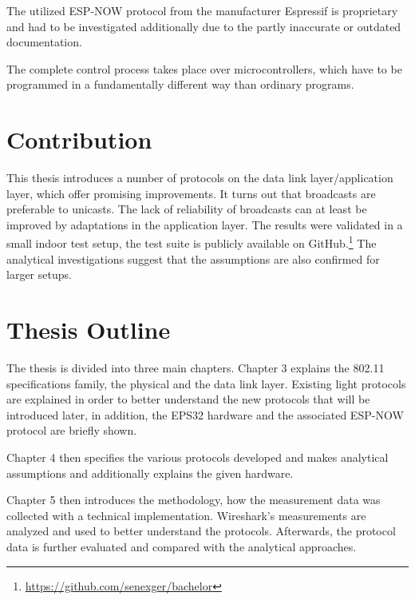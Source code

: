 The utilized ESP-NOW protocol from the manufacturer Espressif is proprietary
and had to be investigated additionally due to the partly inaccurate or outdated documentation.

The complete control process takes place over microcontrollers, 
which have to be programmed in a fundamentally different way than ordinary programs.

\section*{Contribution}

This thesis introduces a number of protocols on the data link layer/application layer,
which offer promising improvements.
It turns out that broadcasts are preferable to unicasts.
The lack of reliability of broadcasts can at least be improved by adaptations in the application layer.
The results were validated in a small indoor test setup,
the test suite is publicly available on GitHub.\footnote{\url{https://github.com/senexger/bachelor}}
The analytical investigations suggest that the assumptions are also confirmed for larger setups.

\section*{Thesis Outline}

The thesis is divided into three main chapters.
Chapter 3 explains the 802.11 specifications family, the physical and the data link layer.
Existing light protocols are explained in order to better understand the new protocols that will be introduced later,
in addition, the EPS32 hardware and the associated ESP-NOW protocol are briefly shown.

Chapter 4 then specifies the various protocols developed and makes analytical assumptions and
additionally explains the given hardware.

Chapter 5 then introduces the methodology, how the measurement data was collected with a technical implementation.
Wireshark's measurements are analyzed and used to better understand the protocols.
Afterwards, the protocol data is further evaluated and compared with the analytical approaches.